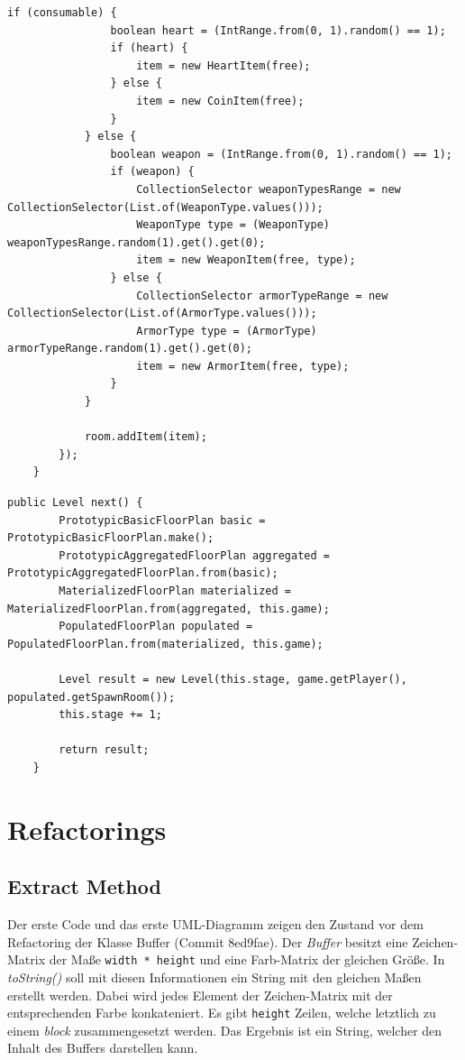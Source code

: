 \begin{lstlisting}[caption={Code Smell: Large Class (Vorher)}]
            if (consumable) {
                boolean heart = (IntRange.from(0, 1).random() == 1);
                if (heart) {
                    item = new HeartItem(free);
                } else {
                    item = new CoinItem(free);
                }
            } else {
                boolean weapon = (IntRange.from(0, 1).random() == 1);
                if (weapon) {
                    CollectionSelector weaponTypesRange = new CollectionSelector(List.of(WeaponType.values()));
                    WeaponType type = (WeaponType) weaponTypesRange.random(1).get().get(0);
                    item = new WeaponItem(free, type);
                } else {
                    CollectionSelector armorTypeRange = new CollectionSelector(List.of(ArmorType.values()));
                    ArmorType type = (ArmorType) armorTypeRange.random(1).get().get(0);
                    item = new ArmorItem(free, type);
                }
            }
            
            room.addItem(item);
        });
    }
\end{lstlisting}

\vspace{0.5cm}
\begin{lstlisting}[caption={Code Smell: Large Class (Nachher)}]
    public Level next() {
        PrototypicBasicFloorPlan basic = PrototypicBasicFloorPlan.make();
        PrototypicAggregatedFloorPlan aggregated = PrototypicAggregatedFloorPlan.from(basic);
        MaterializedFloorPlan materialized = MaterializedFloorPlan.from(aggregated, this.game);
        PopulatedFloorPlan populated = PopulatedFloorPlan.from(materialized, this.game);
        
        Level result = new Level(this.stage, game.getPlayer(), populated.getSpawnRoom());
        this.stage += 1;
        
        return result;
    }
\end{lstlisting}

\section{Refactorings}
\subsection*{Extract Method}
Der erste Code und das erste UML-Diagramm zeigen den Zustand vor
dem Refactoring der Klasse Buffer (Commit 8ed9fae). Der \textit{Buffer}
besitzt eine Zeichen-Matrix der Maße \texttt{width * height} und
eine Farb-Matrix der gleichen Größe. In \textit{toString()} soll mit
diesen Informationen ein String mit den gleichen Maßen erstellt werden.
Dabei wird jedes Element der Zeichen-Matrix mit der entsprechenden
Farbe konkateniert. Es gibt \texttt{height} Zeilen, welche letztlich
zu einem \textit{block} zusammengesetzt werden. Das Ergebnis ist ein
String, welcher den Inhalt des Buffers darstellen kann.

